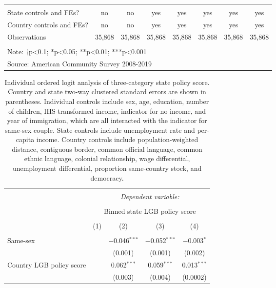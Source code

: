 \documentclass[
  11pt,
]{article}
\begin{document}
\begin{table}[!htbp]
\begin{tabular}{@{\extracolsep{2pt}}lccccccc}
 \hline \\[-1.8ex] 
State controls and FEs? & no & no & yes & yes & yes & yes & yes \\ 
Country controls and FEs? & no & no & yes & yes & yes & yes & yes \\ 
Observations & 35,868 & 35,868 & 35,868 & 35,868 & 35,868 & 35,868 & 35,868 \\ 
\hline 
\hline \\[-1.8ex] 
\multicolumn{8}{l}{Note: †p<0.1; *p<0.05; **p<0.01; ***p<0.001} \\ 
\multicolumn{8}{l}{Source: American Community Survey 2008-2019} \\ 
\end{tabular} 
\end{table}

\begin{table}[!htbp] \centering 
  \caption{Individual ordered logit analysis of three-category state policy score. Country and state two-way clustered standard errors are shown in parentheses. Individual controls include sex, age, education, number of children, IHS-transformed income, indicator for no income, and year of immigration, which are all interacted with the indicator for same-sex couple. State controls include unemployment rate and per-capita income. Country controls include population-weighted distance, contiguous border, common official language, common ethnic language, colonial relationship, wage differential, unemployment differential, proportion same-country stock, and democracy.} 
  \label{tab:ord-full} 
\begin{tabular}{@{\extracolsep{5pt}}lcccc} 
\\[-1.8ex]\hline 
\hline \\[-1.8ex] 
 & \multicolumn{4}{c}{\textit{Dependent variable:}} \\ 
\cline{2-5} 
\\[-1.8ex] & \multicolumn{4}{c}{Binned state LGB policy score} \\ 
\\[-1.8ex] & (1) & (2) & (3) & (4)\\ 
\hline \\[-1.8ex] 
 Same-sex &  & $-$0.046$^{***}$ & $-$0.052$^{***}$ & $-$0.003$^{*}$ \\ 
  &  & (0.001) & (0.001) & (0.002) \\ 
  Country LGB policy score &  & 0.062$^{***}$ & 0.059$^{***}$ & 0.013$^{***}$ \\ 
  &  & (0.003) & (0.004) & (0.0002) \\ 

\end{tabular}
\end{table}
\end{document}
